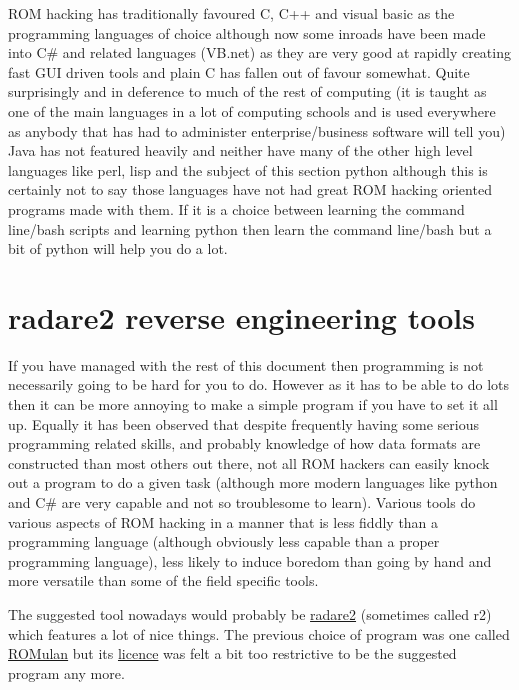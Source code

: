 \documentclass[
]{book}
\begin{document}
ROM hacking has traditionally favoured C, C++ and visual basic as the programming languages of choice although now some inroads have been made into C\# and related languages (VB.net) as they are very good at rapidly creating fast GUI driven tools and plain C has fallen out of favour somewhat. Quite surprisingly and in deference to much of the rest of computing (it is taught as one of the main languages in a lot of computing schools and is used everywhere as anybody that has had to administer enterprise/business software will tell you) Java has not featured heavily and neither have many of the other high level languages like perl, lisp and the subject of this section python although this is certainly not to say those languages have not had great ROM hacking oriented programs made with them. If it is a choice between learning the command line/bash scripts and learning python then learn the command line/bash but a bit of python will help you do a lot.

\hypertarget{radare2-reverse-engineering-tools}{%
\section{radare2 reverse engineering tools}\label{radare2-reverse-engineering-tools}}

If you have managed with the rest of this document then programming is not necessarily going to be hard for you to do. However as it has to be able to do lots then it can be more annoying to make a simple program if you have to set it all up. Equally it has been observed that despite frequently having some serious programming related skills, and probably knowledge of how data formats are constructed than most others out there, not all ROM hackers can easily knock out a program to do a given task (although more modern languages like python and C\# are very capable and not so troublesome to learn). Various tools do various aspects of ROM hacking in a manner that is less fiddly than a programming language (although obviously less capable than a proper programming language), less likely to induce boredom than going by hand and more versatile than some of the field specific tools.

The suggested tool nowadays would probably be \href{http://www.radare.org/y/?p=documentation}{radare2} (sometimes called r2) which features a lot of nice things. The previous choice of program was one called \href{http://stealth.hapisan.com/ROMulan/}{ROMulan} but its \href{http://stealth.hapisan.com/ROMulan/ROMulan.html\#License}{licence} was felt a bit too restrictive to be the suggested program any more.
\end{document}
